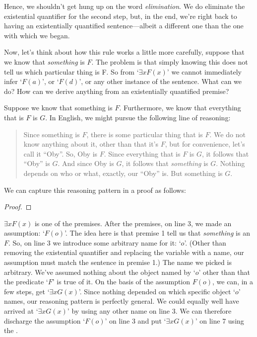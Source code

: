 \noindent Hence, we shouldn't get hung up on the word \textit{elimination}. We do eliminate the existential quantifier for the second step, but, in the end, we're right back to having an existentially quantified sentence---albeit a different one than the one with which we began.

Now, let's think about how this rule works a little more carefully, suppose that we know that \emph{something} is $F$. The problem is that simply knowing this does not tell us which particular thing is F. So from `$\exists x F(x)$' we cannot immediately infer `$F(a)$', or `$F(d)$', or any other instance of the sentence. What can we do?  How can we derive anything from an existentially quantified premise?

Suppose we know that something is $F$. Furthermore, we know that everything that is $F$ is $G$. In English, we might pursue the following line of reasoning:
	\begin{quote}
Since something is $F$, there is some particular thing that is $F$. We do not know anything about it, other than that it's $F$, but for convenience, let's call it ``Oby''. So, Oby is $F$. Since everything that is $F$ is $G$, it follows that ``Oby'' is $G$. And since Oby is $G$, it follows that \emph{something} is $G$. Nothing depends on who or what, exactly, our ``Oby'' is. But something is $G$.
	\end{quote}
We can capture this reasoning pattern in a proof as follows:
\begin{proof}
	 \pr{}
	 \pr{}
	\open
		 \as{}
		 
	\close
\end{proof}

$\exists x F(x)$ is one of the premises. After the premises, on line 3, we made an assumption: `$F(o)$'. The idea here is that premise 1 tell us that \emph{something} is an $F$.  So, on line 3 we introduce some arbitrary name for it: `$o$'. (Other than removing the existential quantifier and replacing the variable with a name, our assumption must match the sentence in premise 1.)
The name we picked is arbitrary. We've assumed nothing about the object named by `$o$' other than that the predicate `$F$' is true of it.  On the basis of the assumption $F(o)$, we can, in a few steps, get `$\exists xG(x)$'.  Since nothing depended on which specific object `$o$' names, our reasoning pattern is perfectly general. We could equally well have arrived at `$\exists xG(x)$'  by using any other name on line 3. We can therefore discharge the assumption `$F(o)$' on line 3 and put `$\exists x G(x)$' on line 7 using the .

